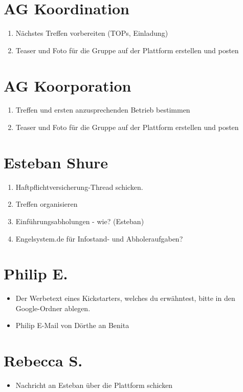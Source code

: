 \documentclass{scrreprt}
\begin{document}
    \section{AG Koordination}
    \begin{enumerate}
    	\item Nächstes Treffen vorbereiten (TOPs, Einladung)
       	\item Teaser und Foto für die Gruppe auf der Plattform erstellen und posten
    \end{enumerate}
    \section{AG Koorporation}
    \begin{enumerate}
    	\item Treffen und ersten anzusprechenden Betrieb bestimmen
       	\item Teaser und Foto für die Gruppe auf der Plattform erstellen und posten
    \end{enumerate}
    \section{Esteban Shure}
    \begin{enumerate}
    	\item Haftpflichtversicherung-Thread schicken.
    	\item Treffen organisieren
    	\item Einführungsabholungen - wie? (Esteban)
    	\item Engelsystem.de für Infostand- und Abholeraufgaben?
    \end{enumerate}
    \section{Philip E.}
    \begin{itemize}
    	\item Der Werbetext eines Kickstarters, welches du erwähntest, bitte in den Google-Ordner ablegen. 
    	\item Philip E-Mail von Dörthe an Benita
    \end{itemize}
    \section{Rebecca S.}
    \begin{itemize}
    	\item Nachricht an Esteban über die Plattform schicken
    \end{itemize}
 
\end{document}
